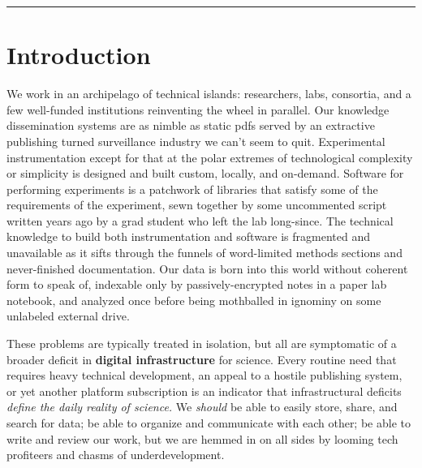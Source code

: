 \begin{center}\rule{0.5\linewidth}{0.5pt}\end{center}

\hypertarget{introduction}{%
\chapter{Introduction}\label{introduction}}

We work in an archipelago of technical islands: researchers, labs,
consortia, and a few well-funded institutions reinventing the wheel in
parallel. Our knowledge dissemination systems are as nimble as static
pdfs served by an extractive
publishing turned surveillance industry we can't seem to quit.
Experimental instrumentation except for that at the polar extremes of
technological complexity or simplicity is designed and built custom,
locally, and on-demand. Software for performing experiments is a
patchwork of libraries that satisfy some of the requirements of the
experiment, sewn together by some uncommented script written years ago
by a grad student who left the lab long-since. The technical knowledge
to build both instrumentation and software is fragmented and unavailable
as it sifts through the funnels of word-limited methods sections and
never-finished documentation. Our data is born into this world without
coherent form to speak of, indexable only by passively-encrypted notes
in a paper lab notebook, and analyzed once before being mothballed in
ignominy on some unlabeled external drive.

These problems are typically treated in isolation, but all are
symptomatic of a broader deficit in \textbf{digital infrastructure} for
science. Every routine need that requires heavy technical development,
an appeal to a hostile publishing system, or yet another platform
subscription is an indicator that infrastructural deficits \emph{define
the daily reality of science.} We \emph{should} be able to easily store,
share, and search for data; be able to organize and communicate with
each other; be able to write and review our work, but we are hemmed in
on all sides by looming tech profiteers and chasms of underdevelopment.


